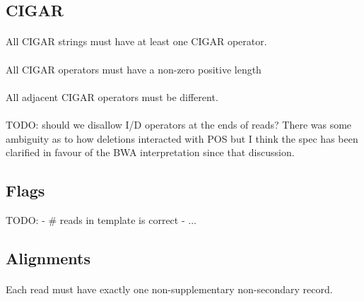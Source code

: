 \documentclass[10pt]{article}
\begin{document}
\subsection{CIGAR}

\paragraph{}

All CIGAR strings must have at least one CIGAR operator.

\paragraph{}

All CIGAR operators must have a non-zero positive length

\paragraph{}

All adjacent CIGAR operators must be different.

\paragraph{}

TODO: should we disallow I/D operators at the ends of reads? There was some ambiguity as to how deletions interacted with POS but I think the spec has been clarified in favour of the BWA interpretation since that discussion.

\subsection{Flags}

TODO:
- # reads in template is correct
- ...

\subsection{Alignments}

\paragraph{}

Each read must have exactly one non-supplementary non-secondary record.

\paragraph{}
\end{document}
